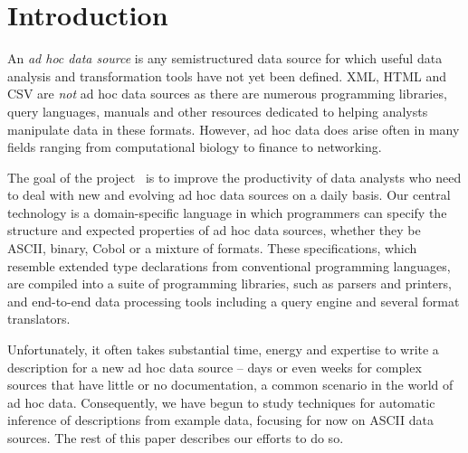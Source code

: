 \documentclass{article}
\begin{document}
\section*{Introduction}
\label{intro}

An {\em ad hoc data source} is any semistructured data source
for which useful data analysis and transformation tools
have not yet been defined. XML, HTML and CSV are {\em not} 
ad hoc data sources as there are numerous programming libraries,
query languages, manuals and other resources dedicated to
helping analysts manipulate data in these formats.
However, ad hoc data does arise often in many fields ranging from
computational biology to finance to networking.

The goal of the \pads{} project~\cite{padsweb} is to improve the
productivity of data analysts who need to deal with new and evolving
ad hoc data sources on a daily basis.  Our central technology is a
domain-specific language in which programmers can specify the
structure and expected properties of ad hoc data sources, whether they
be ASCII, binary, Cobol or a mixture of formats.  These
specifications, which resemble extended type declarations from
conventional programming languages, are compiled into a suite of
programming libraries, such as parsers and printers, and 
end-to-end data processing tools including a query engine
and several format translators.

Unfortunately, it often takes substantial time, energy and expertise
to write a \pads{} description for a new ad hoc data source
-- days or even weeks for complex sources that have little or
no documentation, a common scenario in the world of ad hoc data.
Consequently, we have begun to study techniques for automatic
inference of \pads{} descriptions from example data, focusing for now
on ASCII data sources.   The rest of this 
paper describes our efforts to do so.

\end{document}
